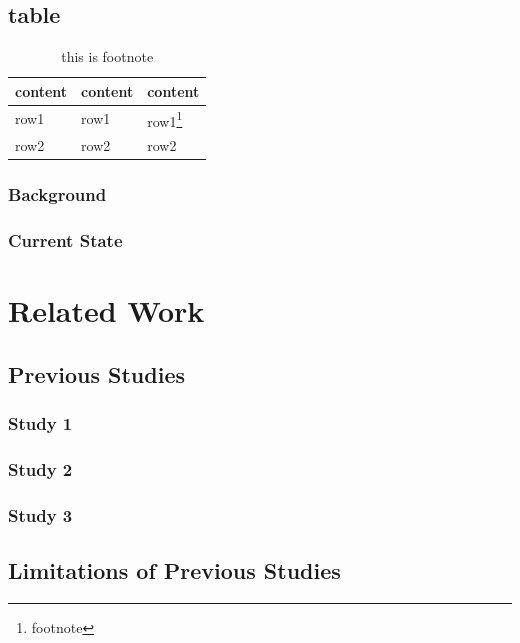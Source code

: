\documentclass[writingLanguage=english, %
    addPageTitle=on,  %
    addDeclaration=on, %
    addMUSTlog=off, %
    addFigTOC=on, %
    addTabTOC=on, %
    refIndent=off, %
    printMod=off, %
]{must}
\begin{document}
\section{table}

\begin{table}
\caption{this is table data}
\centering
\begin{tabularx}{\textwidth}{XXX} %
\toprule
content & content & content \\
\midrule
row1 & row1 & row1\footnote{footnote} \\
row2 & row2 & row2 \\
\bottomrule
\end{tabularx}
\caption*{this is footnote}
\end{table}




\subsection{Background}
\par{}


\subsection{Current State}

\chapter{Related Work}
\section{Previous Studies}
\subsection{Study 1}
\subsection{Study 2}
\subsection{Study 3}
\section{Limitations of Previous Studies}
\end{document}
